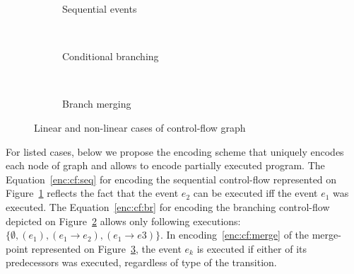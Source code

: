 \begin{figure}[H]
\centering
\begin{subfigure}[b]{0.3\textwidth}
\caption{Sequential events}
\label{encode:cf:seq}
\end{subfigure}
~
\begin{subfigure}[b]{0.35\textwidth}
\caption{Conditional branching}
\label{encode:cf:br}
\end{subfigure}
~
\begin{subfigure}[b]{0.25\textwidth}
\caption{Branch merging}
\label{encode:cf:merge}
\end{subfigure}
\caption{Linear and non-linear cases of control-flow graph}
\label{encode:cf}
\end{figure}

For listed cases, below we propose the encoding scheme that uniquely encodes each node of graph and allows to encode partially executed program.
The Equation~\ref{enc:cf:seq} for encoding the sequential control-flow represented on Figure~\ref{encode:cf:seq} reflects the fact that the event $e_2$ can be executed iff the event $e_1$ was executed. The Equation~\ref{enc:cf:br} for encoding the branching control-flow depicted on Figure~\ref{encode:cf:br} allows only following executions: $\{\emptyset, (e_1), (e_1 \rightarrow e_2), (e_1 \rightarrow e3) \}$. In encoding~\ref{enc:cf:merge} of the merge-point represented on Figure~\ref{encode:cf:merge}, the event $e_k$ is executed if either of its predecessors was executed, regardless of type of the transition.

